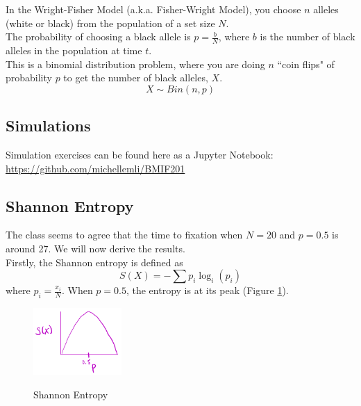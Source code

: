 \documentclass[12pt]{extarticle}
\newcommand{\<}{\langle}
\renewcommand{\>}{\rangle}
\theoremstyle{definition}
\begin{document}
In the Wright-Fisher Model (a.k.a. Fisher-Wright Model), you choose $n$ alleles (white or black) from the population of a set size $N$.\\

\noindent The probability of choosing a black allele is $p = \frac{b}{N}$, where $b$ is the number of black alleles in the population at time $t$.\\

\noindent This is a binomial distribution problem, where you are doing $n$ ``coin flips" of probability $p$ to get the number of black alleles, $X$.
\begin{equation}
    X \sim Bin(n, p) \label{bin}
\end{equation}

\subsection{Simulations}
Simulation exercises can be found here as a Jupyter Notebook: \url{https://github.com/michellemli/BMIF201}\\

\subsection{Shannon Entropy}

The class seems to agree that the time to fixation when $N = 20$ and $p = 0.5$ is around 27. We will now derive the results.\\

\noindent Firstly, the Shannon entropy is defined as
\begin{equation}
    S(X) = -\sum p_i \log_i(p_i) \label{S_X}
\end{equation}
where $\displaystyle p_i = \frac{x_i}{N}$. When $p = 0.5$, the entropy is at its peak (Figure \ref{fig2}).

\begin{figure}[h]
\caption{Shannon Entropy}
\centering
\includegraphics[width=0.3\textwidth]{fig2.png}
\label{fig2}
\end{figure}
\end{document}
